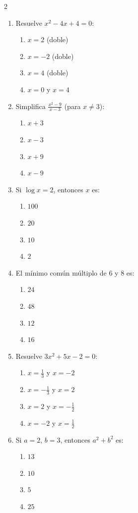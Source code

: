 \documentclass[10pt]{article}
\begin{document}
\begin{multicols}{2}
\begin{enumerate}
\item Resuelve $x^2 - 4x + 4 = 0$:
\begin{enumerate}[label=(\alph*)]
\item $x=2$ (doble)
\item $x= -2$ (doble)
\item $x=4$ (doble)
\item $x=0$ y $x=4$
\end{enumerate}

\item Simplifica $\frac{x^2-9}{x-3}$ (para $x \neq 3$):
\begin{enumerate}[label=(\alph*)]
\item $x+3$
\item $x-3$
\item $x+9$
\item $x-9$
\end{enumerate}

\item Si $\log x = 2$, entonces $x$ es:
\begin{enumerate}[label=(\alph*)]
\item $100$
\item $20$
\item $10$
\item $2$
\end{enumerate}

\item El mínimo común múltiplo de $6$ y $8$ es:
\begin{enumerate}[label=(\alph*)]
\item $24$
\item $48$
\item $12$
\item $16$
\end{enumerate}

\item Resuelve $3x^2 + 5x - 2 = 0$:
\begin{enumerate}[label=(\alph*)]
\item $x = \frac{1}{3}$ y $x = -2$
\item $x = -\frac{1}{3}$ y $x = 2$
\item $x = 2$ y $x = -\frac{1}{2}$
\item $x = -2$ y $x = \frac{1}{2}$
\end{enumerate}

\item Si $a = 2$, $b = 3$, entonces $a^2 + b^2$ es:
\begin{enumerate}[label=(\alph*)]
\item $13$
\item $10$
\item $5$
\item $25$
\end{enumerate}


\end{enumerate}
\end{multicols}
\end{document}
